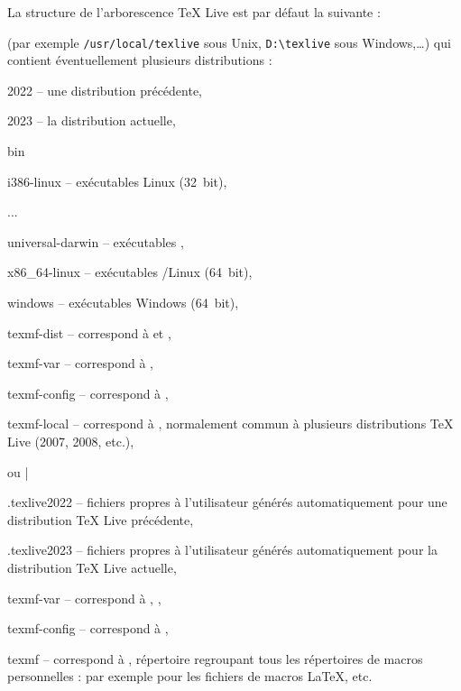 \documentclass[german, english, french]{article}
\renewcommand{\TL}{\TeX{} Live\xspace}%
\begin{document}
La structure de l'arborescence \TL{} est par défaut la suivante :
\begin{description}
\item[racine multi-utilisateur] (par exemple \verb|/usr/local/texlive| sous
  Unix, \verb|D:\texlive| sous Windows,\dots) qui contient éventuellement
  plusieurs distributions :
  \begin{ttdescription}
  \item[2022] -- une distribution précédente,
  \item[2023] -- la distribution actuelle,
    \begin{ttdescription}
    \item[bin] ~
      \begin{ttdescription}
      \item[i386-linux] -- exécutables Linux (32~bit),
      \item[...]
      \item [universal-darwin] -- exécutables \macOS,
      \item [x86\_64-linux] -- exécutables \GNU/Linux (64~bit),
      \item[windows] -- exécutables Windows (64~bit),
      \end{ttdescription}
    \item[texmf-dist] -- correspond à  et
      ,
    \item[texmf-var] -- correspond à ,
    \item[texmf-config] -- correspond à ,
    \end{ttdescription}
  \item[texmf-local] -- correspond à , normalement commun
    à plusieurs distributions \TL{} (2007, 2008, etc.),
  \end{ttdescription}
\item[répertoire personnel de l'utilisateur]  %
  ou |%
  \begin{ttdescription}
  \item[.texlive2022] -- fichiers propres à l'utilisateur générés
    automatiquement pour une distribution \TL{} précédente,
  \item[.texlive2023] -- fichiers propres à l'utilisateur générés
    automatiquement pour la distribution \TL{} actuelle,
    \begin{ttdescription}
    \item[texmf-var] -- correspond à , ,
    \item[texmf-config] -- correspond à ,
    \end{ttdescription}
  \item[texmf] -- correspond à , répertoire regroupant tous
    les répertoires de macros personnelles :  par
    exemple pour les fichiers de macros \LaTeX, etc.
  \end{ttdescription}
\end{description}
\end{document}
